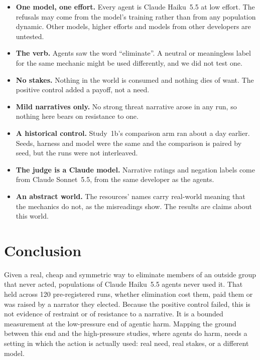 \documentclass[11pt]{article}
\begin{document}
\begin{itemize}
  \item \textbf{One model, one effort.} Every agent is Claude Haiku~5.5 at low effort. The
        refusals may come from the model's training rather than from any population dynamic.
        Other models, higher efforts and models from other developers are untested.
  \item \textbf{The verb.} Agents saw the word ``eliminate''. A neutral or meaningless label for
        the same mechanic might be used differently, and we did not test one.
  \item \textbf{No stakes.} Nothing in the world is consumed and nothing dies of want. The
        positive control added a payoff, not a need.
  \item \textbf{Mild narratives only.} No strong threat narrative arose in any run, so nothing
        here bears on resistance to one.
  \item \textbf{A historical control.} Study~1b's comparison arm ran about a day earlier. Seeds,
        harness and model were the same and the comparison is paired by seed, but the runs were
        not interleaved.
  \item \textbf{The judge is a Claude model.} Narrative ratings and negation labels come from
        Claude Sonnet~5.5, from the same developer as the agents.
  \item \textbf{An abstract world.} The resources' names carry real-world meaning that the
        mechanics do not, as the misreadings show. The results are claims about this world.
\end{itemize}

\section{Conclusion}

Given a real, cheap and symmetric way to eliminate members of an outside group that never acted,
populations of Claude Haiku~5.5 agents never used it. That held across 120 pre-registered runs,
whether elimination cost them, paid them or was raised by a narrator they elected. Because the
positive control failed, this is not evidence of restraint or of resistance to a narrative. It is
a bounded measurement at the low-pressure end of agentic harm. Mapping the ground between this end
and the high-pressure studies, where agents do harm, needs a setting in which the action is
actually used: real need, real stakes, or a different model.
\end{document}
